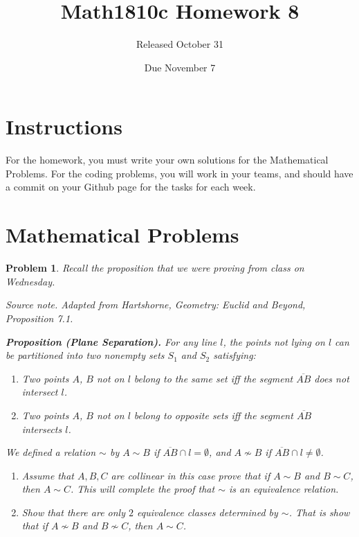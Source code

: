 \documentclass{article}
\title{Math1810c Homework 8}
\author{Released October 31}
\date{Due November 7}
\newtheorem{problem}{Problem}
\begin{document}
\maketitle

\section{Instructions}

For the homework, you must write your own solutions for the Mathematical Problems. For the coding problems, you will work in your teams, and should have a commit on your Github page for the tasks for each week. 

\section{Mathematical Problems}

\begin{problem}
    Recall the proposition that we were proving from class on Wednesday.

    \emph{Source note.} Adapted from Hartshorne, \emph{Geometry: Euclid and
    Beyond}, Proposition 7.1.

    \textbf{Proposition (Plane Separation).} For any line $l$, the points not
    lying on $l$ can be partitioned into two nonempty sets $S_1$ and $S_2$
    satisfying:
    \begin{enumerate}[label=(\alph*)]
        \item Two points $A$, $B$ not on $l$ belong to the same set iff the segment $\overline{AB}$ does not intersect $l$.
        \item Two points $A$, $B$ not on $l$ belong to opposite sets iff the segment $\overline{AB}$ intersects $l$. 
    \end{enumerate}

    We defined a relation $\sim$ by $A\sim B$ if
    $\overline{AB}\cap l=\emptyset$, and $A\not\sim B$ if
    $\overline{AB}\cap l\neq\emptyset$.

    \begin{enumerate}
        \item Assume that $A,B,C$ are collinear in this case prove that if $A\sim B$ and $B\sim C$, then $A\sim C$. This will complete the proof that $\sim$ is an equivalence relation. 

        \item Show that there are only $2$ equivalence classes determined by $\sim$. That is show that if $A\not\sim B$ and $B\not\sim C$, then $A\sim C$. 
    \end{enumerate}
\end{problem}
\end{document}
